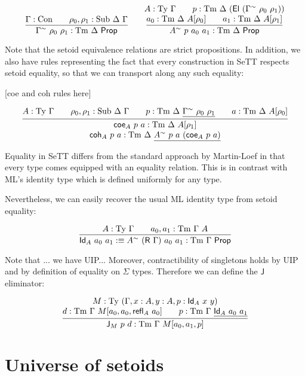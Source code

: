 \documentclass{easychair}
\newcommand{\refl}{\textsf{refl}}
\newcommand{\GG}{\Gamma}
\newcommand{\DD}{\Delta}
\newcommand{\GD}{\Delta}
\newcommand{\R}{\textsf{R}}
\newcommand{\Id}{\textsf{Id}}
\newcommand{\coe}{\textsf{coe}}
\newcommand{\coh}{\textsf{coh}}
\newcommand{\J}{\textsf{J}}
\newcommand{\tyj}[2]{#2 : \Ty\ #1}
\newcommand{\tmj}[3]{#2 : \Tm\ #1\ #3}
\newcommand{\subj}[3]{#1 : \mathrm{Sub}\ #2\ #3}
\newcommand{\Prop}{\textsf{Prop}}
\newcommand{\Con}{\mathrm{Con}}
\newcommand{\Ty}{\mathrm{Ty}}
\newcommand{\Tm}{\mathrm{Tm}}
\newcommand{\El}{\textsf{El}}
\begin{document}
\[
\infer{
  \GG^\sim\ \rho_0\ \rho_1 : \Tm\ \DD\ \Prop
}{
  \GG : \Con \qquad \subj{\rho_0, \rho_1}{\DD}{\GG}
}
\qquad
\infer{
  A^{\sim}\ p\ a_0\ a_1 : \Tm\ \DD\ \Prop
}{
  \deduce{
    a_0 : \Tm\ \DD\ A[\rho_0] \qquad a_1 : \Tm\ \DD\ A[\rho_1]
  }{
    A : \Ty\ \GG \qquad p : \Tm\ \DD\ (\El\ (\GG^{\sim}\ \rho_0\ \rho_1))
  }
}
\]

Note that the setoid equivalence relations are strict propositions. In addition,
we also have rules representing the fact that every construction in SeTT
respects setoid equality, so that we can transport along any such equality:

[coe and coh rules here]

    \[
    \infer{
      \deduce{
        \tmj{\GD}{\coh_A\ p\ a}{\underline{A^\sim\ p\ a\ (\coe_A\ p\ a)}}
      }{
        \tmj{\GD}{\coe_A\ p\ a}{A[\rho_1]}
      }
    }{
      \tyj{\GG}{A} \qquad \subj{\rho_0, \rho_1}{\GD}{\GG} \qquad
      \tmj{\GD}{p}{\underline{\GG^\sim\ \rho_0\ \rho_1}}\qquad
      \tmj{\GD}{a}{A[\rho_0]}
    }
    \]

Equality in SeTT differs from the standard approach by Martin-Loef in that every
type comes equipped with an equality relation. This is in contrast with ML's
identity type which is defined uniformly for any type.

Nevertheless, we can easily recover the usual ML identity type from setoid
equality:

\[
\infer{
  \textsf{Id}_A\ a_0\ a_1 :\equiv A^{\sim}\ (\R\ \GG)\ a_0\ a_1 : \Tm\ \GG\ \Prop
}{
  \tyj{\GG}{A} \qquad \tmj{\GG}{a_0, a_1}{A}
}
\]

Note that ... we have UIP... Moreover, contractibility of singletons holds by
UIP and by definition of equality on $\Sigma$ types. Therefore we can define the
$\J$ eliminator:

\[
\infer{
  \tmj{\GG}{\J_M\ p\ d}{M[a_0, a_1, p]}
}{
  \deduce{
    \tmj{\GG}{d}{M[a_0, a_0, \refl_A\ a_0]}
    \qquad
    \tmj{\GG}{p}{\underline{\Id_A\ a_0\ a_1}}
  }{
  \tyj{(\GG, x : A, y : A, p : \Id_A\ x\ y)}{M}
  }
}
\]


\section{Universe of setoids}


\end{document}
